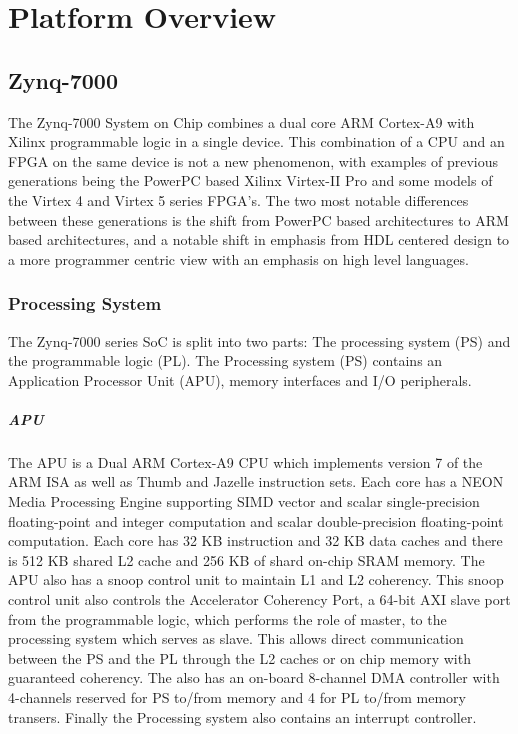 


\chapter{Platform Overview}

\section{Zynq-7000}

The Zynq-7000 System on Chip combines a dual core ARM Cortex-A9 with Xilinx programmable logic in a single device. This combination of a CPU and an FPGA on the same device is not a new phenomenon, with examples of previous generations being the PowerPC based Xilinx Virtex-II Pro and some models of the Virtex 4 and Virtex 5 series FPGA's. The two most notable differences between these generations is the shift from PowerPC based architectures to ARM based architectures, and a notable shift in emphasis from HDL centered design to a more programmer centric view with an emphasis on high level languages. 
	

	\subsection{Processing System}
	The Zynq-7000 series SoC is split into two parts: The processing system (PS) and the programmable logic (PL). The Processing system (PS) contains an Application Processor Unit (APU), memory interfaces and I/O peripherals. 
	
		\paragraph{APU}
		The APU is a Dual ARM Cortex-A9 CPU which implements version 7 of the ARM ISA  as well as Thumb and Jazelle instruction sets. Each core has a NEON Media Processing Engine supporting SIMD vector and scalar single-precision floating-point and integer computation and scalar double-precision floating-point computation. Each core has 32 KB instruction and 32 KB data caches and there is 512 KB shared L2 cache and 256 KB of shard on-chip SRAM memory. The APU also has a snoop control unit to maintain L1 and L2 coherency. This snoop control unit also controls the Accelerator Coherency Port, a 64-bit AXI slave port from the programmable logic, which performs the role of master, to the processing system which serves as slave. This allows direct communication between the PS and the PL through the L2 caches or on chip memory with guaranteed coherency. The also has an on-board 8-channel DMA controller with 4-channels reserved for PS to/from memory and 4 for PL to/from memory transers. Finally the Processing system also contains an interrupt controller.

